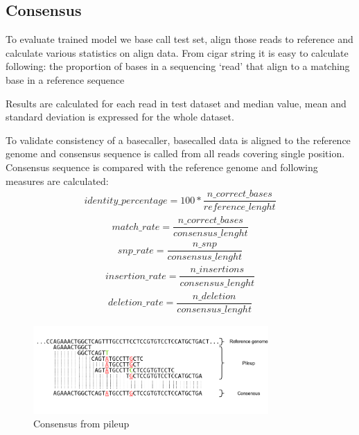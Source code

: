 \documentclass[times, utf8, diplomski, numeric, english]{fer}
\begin{document}
\subsection{Consensus}
To evaluate trained model we base call test set, align those reads to reference and calculate various statistics on align data.
From cigar string it is easy to calculate following:
the proportion of bases in a sequencing ‘read’ that align to a matching base in a reference sequence



Results are calculated for each read in test dataset and median value, mean and standard deviation is expressed for the whole dataset.

To validate consistency of a basecaller, basecalled data is aligned to the reference genome and consensus sequence is called from all reads covering single position. Consensus sequence is compared with the reference genome and following measures are calculated:
\begin{equation}
\begin{gathered}
identity\_percentage =  100 * \dfrac{n\_correct\_bases}{reference\_lenght}
\end{gathered}
\end{equation}
\begin{equation}
\begin{gathered}
match\_rate = \dfrac{n\_correct\_bases}{consensus\_lenght}
\end{gathered}
\end{equation}
\begin{equation}
\begin{gathered}
snp\_rate = \dfrac{n\_snp}{consensus\_lenght}
\end{gathered}
\end{equation}
\begin{equation}
\begin{gathered}
insertion\_rate = \dfrac{n\_insertions}{consensus\_lenght}
\end{gathered}
\end{equation}
\begin{equation}
\begin{gathered}
deletion\_rate = \dfrac{n\_deletion}{consensus\_lenght}
\end{gathered}
\end{equation}



\begin{figure}[!ht]
	\begin{center}
		\includegraphics[width=0.8\textwidth]{./imgs/consnesus.png}
		\caption{Consensus from pileup}
		\label{fg:consensus}
	\end{center}
\end{figure}
\end{document}
